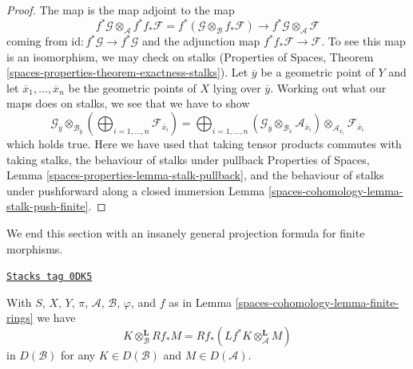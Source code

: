 \begin{proof}
The map is the map adjoint to the map
$$
f^*\mathcal{G} \otimes_\mathcal{A}
f^* f_*\mathcal{F} =
f^*(\mathcal{G} \otimes_\mathcal{B} f_*\mathcal{F})
\longrightarrow
f^*\mathcal{G} \otimes_\mathcal{A} \mathcal{F}
$$
coming from $\text{id} : f^*\mathcal{G} \to f^*\mathcal{G}$
and the adjunction map $f^* f_*\mathcal{F} \to \mathcal{F}$.
To see this map is an isomorphism, we may check on stalks
(Properties of Spaces, Theorem
\ref{spaces-properties-theorem-exactness-stalks}).
Let $\overline{y}$ be a geometric point of $Y$ and
let $\overline{x}_1, \ldots, \overline{x}_n$ be the geometric
points of $X$ lying over $\overline{y}$.
Working out what our maps does on stalks, we see that we
have to show
$$
\mathcal{G}_{\overline{y}}
\otimes_{\mathcal{B}_{\overline{y}}}
\left(
\bigoplus\nolimits_{i = 1, \ldots, n} \mathcal{F}_{\overline{x}_i}
\right) =
\bigoplus\nolimits_{i = 1, \ldots, n}
(\mathcal{G}_{\overline{y}}
\otimes_{\mathcal{B}_{\overline{x}}}
\mathcal{A}_{\overline{x}_i}) \otimes_{\mathcal{A}_{\overline{x}_i}}
\mathcal{F}_{\overline{x}_i}
$$
which holds true. Here we have used that
taking tensor products commutes with taking stalks, the
behaviour of stalks under pullback
Properties of Spaces, Lemma \ref{spaces-properties-lemma-stalk-pullback}, and
the behaviour of stalks under pushforward along a closed immersion
Lemma \ref{spaces-cohomology-lemma-stalk-push-finite}.
\end{proof}

We end this section with an insanely general projection formula
for finite morphisms.

\begin{lemma}
\label{spaces-cohomology-lemma-projection-formula-finite}
\href{https://stacks.math.columbia.edu/tag/0DK5}{\texttt{Stacks tag 0DK5}}

With $S$, $X$, $Y$, $\pi$, $\mathcal{A}$, $\mathcal{B}$, $\varphi$, and $f$
as in Lemma \ref{spaces-cohomology-lemma-finite-rings} we have
$$
K \otimes_\mathcal{B}^\mathbf{L} Rf_*M =
Rf_*(Lf^*K \otimes_\mathcal{A}^\mathbf{L} M)
$$
in $D(\mathcal{B})$ for any $K \in D(\mathcal{B})$ and
$M \in D(\mathcal{A})$.
\end{lemma}

